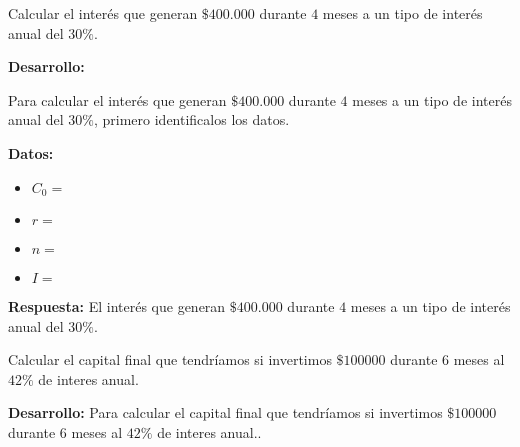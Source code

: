 \documentclass[12pt]{examdesign}
\theoremstyle{plain}
\theoremstyle{definition}
\theoremstyle{remark}
\begin{document}
    \begin{shortanswer}[title={Leemos el material de consulta y realizamos las actividades propuestas.}, rearrange=no]
    	\begin{question}
    		Calcular el interés que generan $\$400.000$ durante $4$ meses a un tipo de interés anual del $30\%$.
    		
    	    \begin{answer}
    	    	\textbf{Desarrollo:}
    	    	
    	    	Para calcular el interés que generan $\$400.000$ durante $4$ meses a un tipo de interés anual del $30\%$, primero identificalos los datos.
    	    	
    	    	\textbf{Datos:}
    	    	
    	    	\begin{itemize}
    	    		\item $C_{0}=$
    	    		\item $r=$
    	    		\item $n=$
    	    		\item $I=$
    	    	\end{itemize}
        	
    	    	\textbf{Respuesta:} El interés que generan $\$400.000$ durante $4$ meses a un tipo de interés anual del $30\%$.
    	    \end{answer}
    	\end{question}
        
        \begin{question}
        	Calcular el capital final que tendríamos si invertimos $\$100000$ durante $6$ meses al $42\%$ de interes anual.
        	
        	\begin{answer}
        		\textbf{Desarrollo:} Para calcular el capital final que tendríamos si invertimos $\$100000$ durante $6$ meses al $42\%$ de interes anual..
        			    

\end{answer}
\end{question}
\end{shortanswer}
\end{document}
